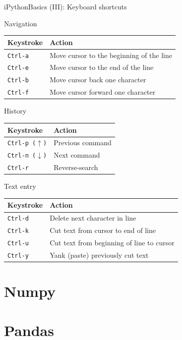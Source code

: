 \documentclass[10pt,compress]{beamer} %
\begin{document}
\begin{frame}{iPython}{Basics (III): Keyboard shortcuts}
    \footnotesize{
        Navigation\\
        \begin{tabular}{ll}\hline
       \textbf{Keystroke} &  \textbf{Action}\\ \hline
	   \texttt{Ctrl-a} & Move cursor to the beginning of the line  \\
	   \texttt{Ctrl-e} & Move cursor to the end of the line  \\
	   \texttt{Ctrl-b} & Move cursor back one character  \\
	   \texttt{Ctrl-f} & Move cursor forward one character  \\\hline
        \end{tabular}


    \bigskip
     History\\
       \begin{tabular}{ll}\hline
       \textbf{Keystroke} &  \textbf{Action}\\ \hline
       \texttt{Ctrl-p ($\uparrow$)} & Previous command  \\
       \texttt{Ctrl-n ($\downarrow$)} & Next command  \\
	   \texttt{Ctrl-r} & Reverse-search  \\\hline
    \end{tabular}


    \bigskip

        Text entry\\
        \begin{tabular}{ll}\hline
       \textbf{Keystroke} &  \textbf{Action}\\ \hline
	   \texttt{Ctrl-d} & Delete next character in line  \\
	   \texttt{Ctrl-k} & Cut text from cursor to end of line  \\
	   \texttt{Ctrl-u} & Cut text from beginning of line to cursor  \\
       \texttt{Ctrl-y} & Yank (paste) previously cut text  \\\hline
       \end{tabular}
   }
\end{frame}




\section{Numpy}
\section{Pandas}
\end{document}
